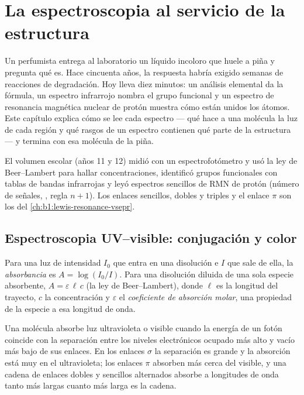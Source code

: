 \chapter{La espectroscopia al servicio de la estructura}\label{ch:b1:structure-spectroscopy}

Un perfumista entrega al laboratorio un líquido incoloro que huele a piña
y pregunta qué es. Hace cincuenta años, la respuesta habría exigido
semanas de reacciones de degradación. Hoy lleva diez minutos: un análisis
elemental da la fórmula, un espectro infrarrojo nombra el grupo funcional
y un espectro de resonancia magnética nuclear de protón muestra cómo
están unidos los átomos. Este capítulo explica cómo se lee cada espectro
--- qué hace a una molécula la luz de cada región y qué rasgos de un
espectro contienen qué parte de la estructura --- y termina con esa
molécula de la piña.

\begin{recall}
El volumen escolar (años 11 y 12) midió  con un
espectrofotómetro y usó la ley de Beer--Lambert para hallar
concentraciones, identificó grupos funcionales con tablas de bandas
infrarrojas y leyó espectros sencillos de RMN de protón (número de
señales, , regla $n + 1$). Los enlaces sencillos, dobles y
triples y el enlace $\pi$ son los del
\cref{ch:b1:lewis-resonance-vsepr}.
\end{recall}

\section{Espectroscopia UV--visible: conjugación y color}

\begin{definition}\label{def:b1:structure-spectroscopy:absorbance}
Para una luz de intensidad $I_0$ que entra en una disolución e $I$ que
sale de ella, la \emph{absorbancia} es
$A = \log(I_0/I)$. Para una disolución diluida de una sola especie
absorbente, $A = \varepsilon\,\ell\,c$ (la ley de Beer--Lambert), donde
$\ell$ es la longitud del trayecto, $c$ la concentración y $\varepsilon$
el \emph{coeficiente de absorción molar},
una propiedad de la especie a esa longitud de onda.
\end{definition}

Una molécula absorbe luz ultravioleta o visible cuando la energía de un
fotón coincide con la separación entre los niveles electrónicos ocupado
más alto y vacío más bajo de sus enlaces. En los enlaces $\sigma$ la
separación es grande y la absorción está muy en el ultravioleta; los
enlaces $\pi$ absorben más cerca del visible, y una cadena de enlaces
dobles y sencillos alternados absorbe a longitudes de onda tanto más
largas cuanto más larga es la cadena.

